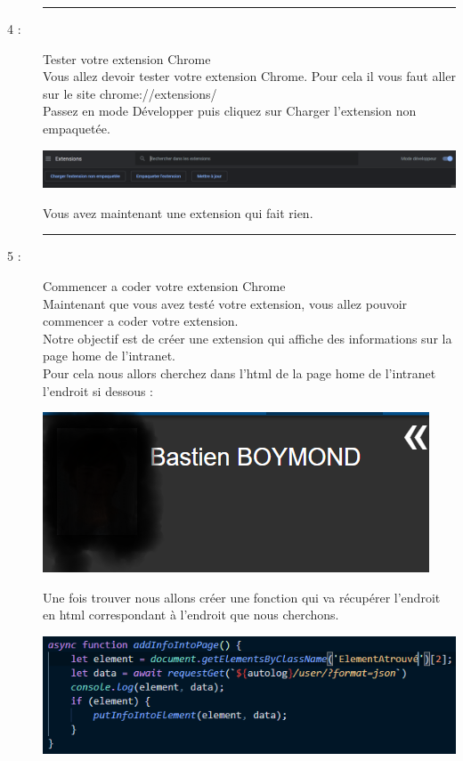 \documentclass{article}
\begin{document}
\begin{description}
        \begin{center}
            \rule{0.75\linewidth}{1pt}
        \end{center}
        \item[4 :]{Tester votre extension Chrome} \\ Vous allez devoir tester votre extension Chrome. Pour cela il vous faut aller sur le site chrome://extensions/
        \\ Passez en mode Développer puis cliquez sur Charger l'extension non empaquetée.
        \begin{center}
            \includegraphics[scale=0.3]{HowToTestChorme.PNG}
        \end{center}
        Vous avez maintenant une extension qui fait rien.
        \begin{center}
            \rule{0.75\linewidth}{1pt}
        \end{center}
        \item[5 :]{Commencer a coder votre extension Chrome} \\ Maintenant que vous avez testé votre extension, vous allez pouvoir commencer a coder votre extension.
        \\ Notre objectif est de créer une extension qui affiche des informations sur la page home de l'intranet.
        \\ Pour cela nous allors cherchez dans l'html de la page home de l'intranet l'endroit si dessous :
        \begin{center}
            \includegraphics[scale=0.5]{FindInHtml.PNG}
        \end{center}
        Une fois trouver nous allons créer une fonction qui va récupérer l'endroit en html correspondant à l'endroit que nous cherchons.
        \begin{center}
            \includegraphics[scale=0.8]{indexjspremierePartie.PNG}

\end{center}
\end{description}
\end{document}
